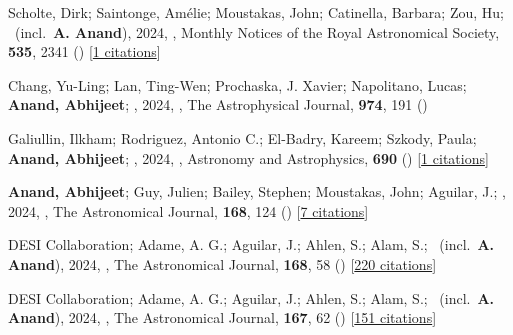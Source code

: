 \item[{\color{numcolor}\scriptsize11}] Scholte, Dirk; Saintonge, Am{\'e}lie; Moustakas, John; Catinella, Barbara; Zou, Hu; \etal\ (incl.\ \textbf{A. Anand}), 2024, , Monthly Notices of the Royal Astronomical Society, \textbf{535}, 2341 () [\href{https://ui.adsabs.harvard.edu/abs/2024MNRAS.535.2341S}{1 citations}]

\item[{\color{numcolor}\scriptsize10}] Chang, Yu-Ling; Lan, Ting-Wen; Prochaska, J. Xavier; Napolitano, Lucas; \textbf{Anand, Abhijeet}; \etal, 2024, , The Astrophysical Journal, \textbf{974}, 191 ()

\item[{\color{numcolor}\scriptsize9}] Galiullin, Ilkham; Rodriguez, Antonio C.; El-Badry, Kareem; Szkody, Paula; \textbf{Anand, Abhijeet}; \etal, 2024, , Astronomy and Astrophysics, \textbf{690} () [\href{https://ui.adsabs.harvard.edu/abs/2024A&A...690A.374G}{1 citations}]

\item[{\color{numcolor}\scriptsize8}] \textbf{Anand, Abhijeet}; Guy, Julien; Bailey, Stephen; Moustakas, John; Aguilar, J.; \etal, 2024, , The Astronomical Journal, \textbf{168}, 124 () [\href{https://ui.adsabs.harvard.edu/abs/2024AJ....168..124A}{7 citations}]

\item[{\color{numcolor}\scriptsize7}] DESI Collaboration; Adame, A. G.; Aguilar, J.; Ahlen, S.; Alam, S.; \etal\ (incl.\ \textbf{A. Anand}), 2024, , The Astronomical Journal, \textbf{168}, 58 () [\href{https://ui.adsabs.harvard.edu/abs/2024AJ....168...58D}{220 citations}]

\item[{\color{numcolor}\scriptsize6}] DESI Collaboration; Adame, A. G.; Aguilar, J.; Ahlen, S.; Alam, S.; \etal\ (incl.\ \textbf{A. Anand}), 2024, , The Astronomical Journal, \textbf{167}, 62 () [\href{https://ui.adsabs.harvard.edu/abs/2024AJ....167...62D}{151 citations}]

